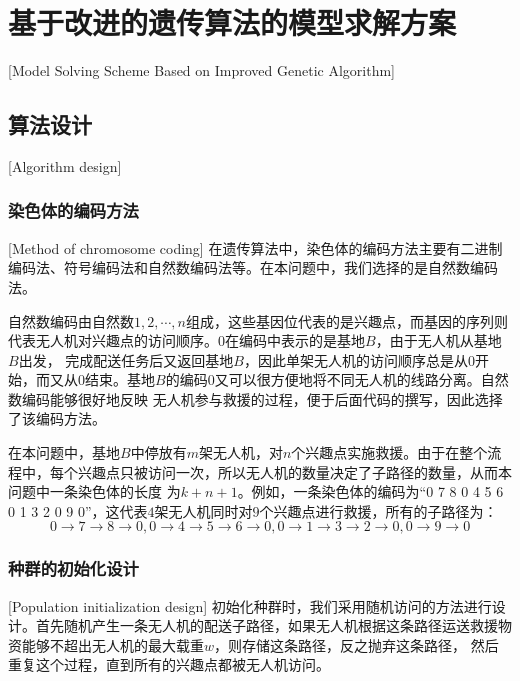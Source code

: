 
\chapter{基于改进的遗传算法的模型求解方案}[Model Solving Scheme Based on Improved Genetic Algorithm]

\section{算法设计}[Algorithm design]

\subsection{染色体的编码方法}[Method of chromosome coding]
在遗传算法中，染色体的编码方法主要有二进制编码法、符号编码法和自然数编码法等。在本问题中，我们选择的是自然数编码法。


自然数编码由自然数$1,2,\cdots,n$组成，这些基因位代表的是兴趣点，而基因的序列则代表无人机对兴趣点的访问顺序。$0$在编码中表示的是基地$B$，由于无人机从基地$B$出发，
完成配送任务后又返回基地$B$，因此单架无人机的访问顺序总是从$0$开始，而又从$0$结束。基地$B$的编码$0$又可以很方便地将不同无人机的线路分离。自然数编码能够很好地反映
无人机参与救援的过程，便于后面代码的撰写，因此选择了该编码方法。


在本问题中，基地$B$中停放有$m$架无人机，对$n$个兴趣点实施救援。由于在整个流程中，每个兴趣点只被访问一次，所以无人机的数量决定了子路径的数量，从而本问题中一条染色体的长度
为$k+n+1$。例如，一条染色体的编码为``0 7 8 0 4 5 6 0 1 3 2 0 9 0''，这代表$4$架无人机同时对$9$个兴趣点进行救援，所有的子路径为：
$$0\rightarrow7\rightarrow8\rightarrow0,0\rightarrow4\rightarrow5\rightarrow6\rightarrow0,0\rightarrow1\rightarrow3\rightarrow2\rightarrow0,0\rightarrow9\rightarrow0$$

\subsection{种群的初始化设计}[Population initialization design]
初始化种群时，我们采用随机访问的方法进行设计。首先随机产生一条无人机的配送子路径，如果无人机根据这条路径运送救援物资能够不超出无人机的最大载重$w$，则存储这条路径，反之抛弃这条路径，
然后重复这个过程，直到所有的兴趣点都被无人机访问。


